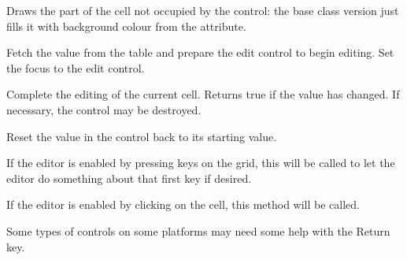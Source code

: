 \label{wxgridcelleditorpaintbackground}


Draws the part of the cell not occupied by the control: the base class
version just fills it with background colour from the attribute.

\label{wxgridcelleditorbeginedit}


Fetch the value from the table and prepare the edit control
to begin editing. Set the focus to the edit control.

\label{wxgridcelleditorendedit}


Complete the editing of the current cell. Returns true if the value has
changed. If necessary, the control may be destroyed.

\label{wxgridcelleditorreset}


Reset the value in the control back to its starting value.

\label{wxgridcelleditorstartingkey}


If the editor is enabled by pressing keys on the grid,
this will be called to let the editor do something about
that first key if desired.

\label{wxgridcelleditorstartingclick}


If the editor is enabled by clicking on the cell, this method will be
called.

\label{wxgridcelleditorhandlereturn}


Some types of controls on some platforms may need some help
with the Return key.

\label{wxgridcelleditordestroy}

